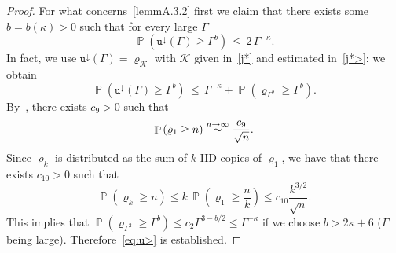 \documentclass[AHL,Unicode,longabstracts,published]{cedram}
\renewcommand*\ss{\mathtt{u}}
\newcommand{\tudown}{\ss^\downarrow}
\DeclareMathOperator{\p}{\mathbb{P}}
\newcommand{\clK}{\mathcal{K}}
\renewcommand*{\to}{\mathchoice{\longrightarrow}{\rightarrow}{\rightarrow}{\rightarrow}}
\begin{document}
\begin{proof}
For what concerns~\eqref{lemmA.3.2} first we claim that there exists some $b=b(\kappa)>0$ such that for every large $\Gamma$
\begin{equation}
\p\left(\tudown(\Gamma)\ge \Gamma^b\right) \,\le \, 2\, \Gamma^{-\kappa}.\label{eq:u>}
\end{equation}
In fact, we use $\tudown(\Gamma)=\varrho_{\clK}$ with ${\clK}$ given in~\eqref{j*} and estimated in~\eqref{j*>}: we obtain
\begin{equation}
\p\left(\tudown(\Gamma)\ge \Gamma^b\right) \,\le \, \Gamma^{-\kappa} + \p\left(\varrho_{\Gamma^2} \ge \Gamma^b\right).\label{eq:u>1}
\end{equation}
By~\cite[Theorem~4.6]{kersting-vatutin}, there exists $c_{9}>0$ such that
\begin{equation}
\p\left(\varrho_1 \ge n\right) \stackrel{n \to \infty}\sim \frac{c_{9}}{\sqrt{n}}.
\end{equation}
Since $\varrho_k$ is distributed as the sum of $k$ IID copies of $\varrho_1$, we have that there exists $c_{10}>0$ such that
\begin{equation}
\p\left(\varrho_k \ge n\right) \le k\, \p\left(\varrho_1 \ge \frac{n}{k}\right)\le c_{10} \frac{k^{3/2}}{\sqrt{n}}.
\end{equation}
This implies that $\p(\varrho_{\Gamma^2} \ge \Gamma^b) \le c_{2} \Gamma^{3-b/2} \le \Gamma^{-\kappa}$ if we choose {{ $b> 2\kappa+6$}} ($\Gamma$ being large). Therefore~\eqref{eq:u>} is established.




\end{proof}
\end{document}
